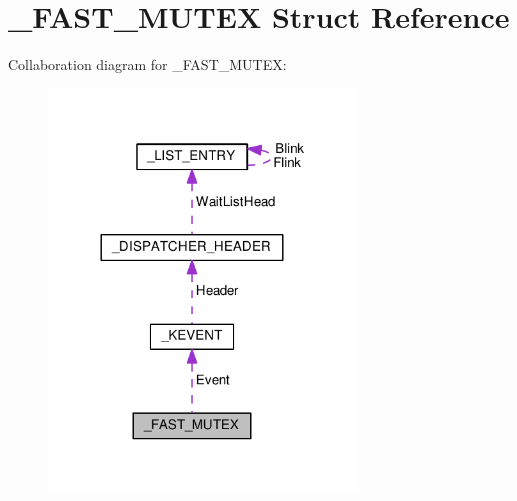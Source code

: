 \hypertarget{struct__FAST__MUTEX}{}\section{\+\_\+\+F\+A\+S\+T\+\_\+\+M\+U\+T\+E\+X Struct Reference}
\label{struct__FAST__MUTEX}


Collaboration diagram for \+\_\+\+F\+A\+S\+T\+\_\+\+M\+U\+T\+E\+X\+:
\nopagebreak
\begin{figure}[H]
\begin{center}
\leavevmode
\includegraphics[width=233pt]{struct__FAST__MUTEX__coll__graph}
\end{center}
\end{figure}
